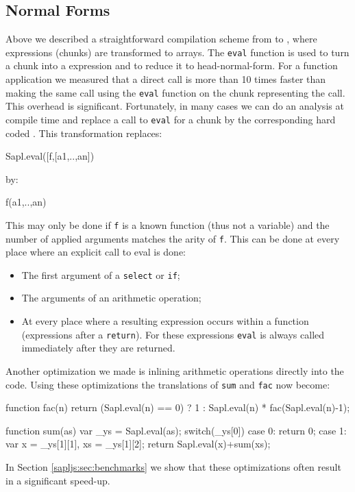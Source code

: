 \subsection{Normal Forms}
Above we described a straightforward compilation scheme from \Sapl to \JS, 
where expressions (chunks) are transformed to arrays.
The \texttt{eval} function is used to turn a chunk into a \JS expression and to reduce it to head-normal-form.
For a function application  we measured that a direct \JS call is more than 10 times faster 
than making the same call using the 
\texttt{eval} function on the chunk representing the call. This overhead is significant. 
Fortunately, in many cases we can do an analysis at compile time and replace a call to \texttt{eval} for a chunk by the corresponding hard coded \JS.
This transformation replaces:
\begin{CleanCode}
Sapl.eval([f,[a1,..,an])
\end{CleanCode}
by:
\begin{CleanCode}
f(a1,..,an)
\end{CleanCode}
This may only be done if \texttt{f} is a known function (thus not a variable) and the number of applied arguments matches the
arity of \texttt{f}.
This can be done at every place where an explicit call to \textsf{eval} is done:
\begin{itemize}
\item The first argument of a \texttt{select} or \texttt{if};
\item The arguments of an arithmetic operation;
\item At every place where a resulting expression occurs within a \JS function (expressions after a \texttt{return}).
For these expressions  \texttt{eval} is always called immediately after they are returned.
\end{itemize}
Another optimization we made is inlining arithmetic operations directly into the code.
Using these optimizations the translations of \texttt{sum} and \texttt{fac} now become:
\begin{CleanCode}
function fac(n){
	return (Sapl.eval(n) == 0) ? 1 : Sapl.eval(n) * fac(Sapl.eval(n)-1);
}

function sum(as){
	var _ys = Sapl.eval(as);
	switch(_ys[0]){
		case 0: return 0;
		case 1: var x = _ys[1][1], xs = _ys[1][2]; 
		        return Sapl.eval(x)+sum(xs);
	}
}
\end{CleanCode}
In Section \ref{sapljs:sec:benchmarks} we show that these optimizations often result in 
a significant speed-up.

